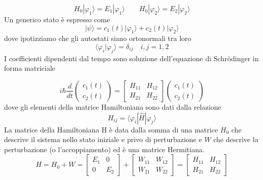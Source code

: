 \begin{equation}
H_0 |\varphi_1 \rangle = E_1 |\varphi_1 \rangle \quad \quad H_0 |\varphi_2 \rangle = E_2 |\varphi_2\rangle 
\end{equation}
Un generico stato \`e espresso come
\begin{equation*}
	|\psi \rangle = c_1(t)|\varphi_1 \rangle + c_2(t) |\varphi_2 \rangle 
\end{equation*}
dove ipotizziamo che gli autostati siano ortonormali tra loro
\begin{equation*}
	\langle \varphi_i | \varphi_j \rangle = \delta_{ij} \quad i,j = 1,2
\end{equation*}
I coefficienti dipendenti dal tempo sono soluzione dell'equazione di Schr\"odinger in forma matriciale 

\begin{equation*}
	i \hbar  \frac{d}{dt}\left ( \begin{array}{c} c_1(t) \\ c_2(t) \end{array}\right) = \left [ \begin{array}{cc} 
		H_{11} & H_{12} \\ H_{21} & H_{22}
	\end{array}\right ] \left ( \begin{array}{c} c_1(t) \\ c_2(t) \end{array}\right) 
\end{equation*}
dove gli elementi della matrice Hamiltoniana sono dati dalla relazione
\begin{equation}
	H_{ij} = \langle \varphi_i|\hat{H}|\varphi_j \rangle 
\end{equation}
La matrice della Hamiltoniana H \`e data dalla somma di una matrice $H_0$ che descrive il sistema nello stato iniziale e privo di perturbazione e $W$ che descrive la perturbazione (o l'accoppiamento) ed \`e una matrice Hermitiana.
\begin{equation*}
	H =H_0 + W = \left [ \begin{array}{cc}
		E_1 & 0 \\ 0 & E_2 
	\end{array}\right] + \left [ \begin{array}{cc}
	W_{11} & W_{12} \\ W_{21} & W_{22}
	\end{array}\right ]  = \left [ \begin{array}{cc} 
		H_{11} & H_{12} \\ H_{21} & H_{22}
	\end{array}\right ] 
\end{equation*}
